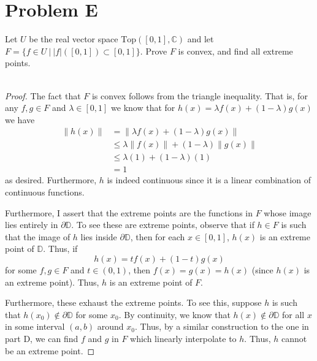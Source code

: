 \documentclass[fontsize=11pt]{scrartcl} %
\numberwithin{equation}{section} %
\numberwithin{figure}{section} %
\numberwithin{table}{section} %
\newcommand{\C}{\mathbb{C}}
\begin{document}
\newpage

\section*{Problem E}
Let $U$ be the real vector space $\text{Top}([0,1],\C)$ and let $F = \{f\in U\
|\ |f|([0,1])\subset [0,1]\}$. Prove $F$ is convex, and find all extreme points.
\\
\\
\begin{proof}
    The fact that $F$ is convex follows from the triangle inequality. That is,
    for any $f,g\in F$ and $\lambda\in [0,1]$ we know that for $h(x) = \lambda
    f(x) + (1-\lambda)g(x)$ we have
    \[
\begin{aligned}
    \|h(x)\| &= \|\lambda f(x) + (1-\lambda)g(x)\|\\
    &\leq \lambda\|f(x)\| + (1-\lambda)\|g(x)\|\\
    &\leq \lambda (1) + (1-\lambda)(1)\\
    &=1
\end{aligned}
    \]
    as desired. Furthermore, $h$ is indeed continuous since it is a linear
    combination of continuous functions.

    Furthermore, I assert that the extreme points are the functions in $F$ whose
    image lies entirely in $\partial\mathbb{D}$. To see these are extreme
    points, observe that if $h\in F$ is such that the image of $h$ lies inside
    $\partial\mathbb{D}$, then for each $x\in[0,1]$, $h(x)$ is an extreme point
    of $\mathbb{D}$. Thus, if
    \[
        h(x) = tf(x) + (1-t)g(x)
    \]
    for some $f,g\in F$ and $t\in (0,1)$, then $f(x)=g(x)=h(x)$ (since $h(x)$ is
    an extreme point). Thus, $h$ is an extreme point of $F$.

    Furthermore, these exhaust the extreme points. To see this, suppose $h$ is
    such that $h(x_0)\not\in\partial\mathbb{D}$ for some $x_0$. By continuity, we
    know that $h(x)\not\in\partial\mathbb{D}$ for all $x$ in some interval
    $(a,b)$ around $x_0$. Thus, by a similar construction to the one in part D,
    we can find $f$ and $g$ in $F$ which linearly interpolate to $h$. Thus, $h$
    cannot be an extreme point.
\end{proof}
\end{document}
